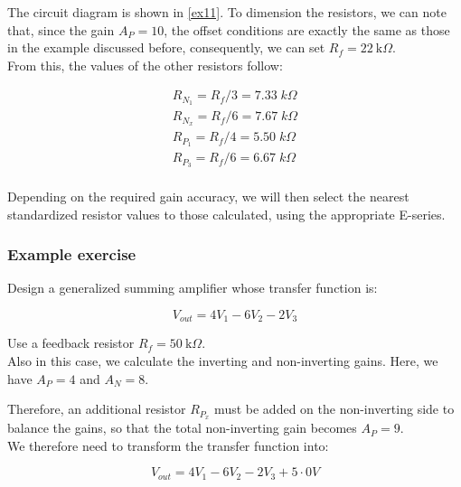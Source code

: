 \documentclass[../main.tex]{subfiles}
\begin{document}
The circuit diagram is shown in \autoref{ex11}. To dimension the resistors, we can note that, since the gain $A_P = 10$, the offset conditions are exactly the same as those in the example discussed before, consequently, we can set $R_f = 22\ \text{k}\Omega$.\\

From this, the values of the other resistors follow:

\begin{equation}
\begin{aligned}
	R_{N_1} = R_f / 3 = 7.33 \; \unit{k}\Omega\\
	R_{N_x} = R_f / 6 = 7.67 \; \unit{k}\Omega\\
	R_{P_1} = R_f / 4 = 5.50 \; \unit{k}\Omega\\
	R_{P_3} = R_f / 6 = 6.67 \; \unit{k}\Omega\\
\end{aligned}	
\end{equation}

Depending on the required gain accuracy, we will then select the nearest standardized resistor values to those calculated, using the appropriate E-series.\\

\subsubsection*{Example exercise}

Design a generalized summing amplifier whose transfer function is:

\begin{equation}
	V_{out} = 4V_1 - 6V_2 - 2V_3
\end{equation}

Use a feedback resistor $R_f = 50\ \text{k}\Omega$.\\

Also in this case, we calculate the inverting and non-inverting gains. Here, we have $A_P = 4$ and $A_N = 8$. 

Therefore, an additional resistor $R_{P_x}$ must be added on the non-inverting side to balance the gains, so that the total non-inverting gain becomes $A_P = 9$.\\ 

We therefore need to transform the transfer function into:

\begin{equation}
	V_{out} = 4V_1 - 6V_2 - 2V_3 + 5 \cdot 0V
\end{equation}
\end{document}
